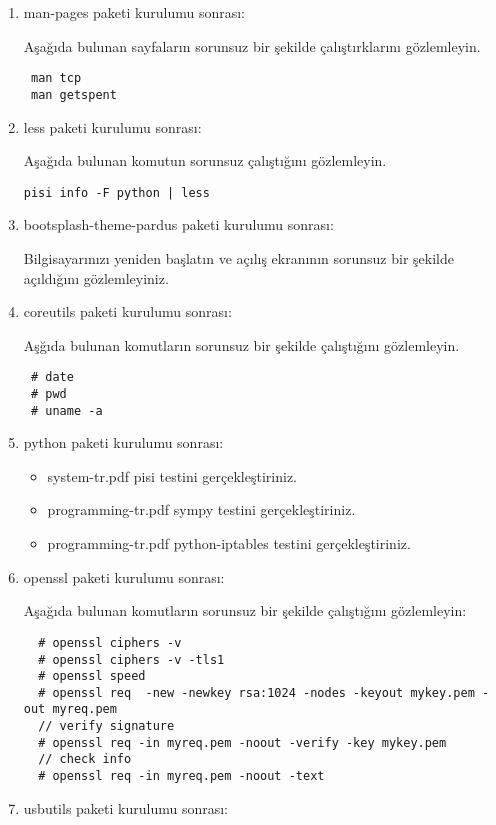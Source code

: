 \documentclass[a4paper,10pt]{article}
\begin{document}
\begin{enumerate}
\item man-pages paketi kurulumu sonrası:

Aşağıda bulunan sayfaların sorunsuz bir şekilde çalıştırklarını gözlemleyin.
\begin{verbatim}
 man tcp
 man getspent
\end{verbatim}


\item less paketi kurulumu sonrası:

Aşağıda bulunan komutun sorunsuz çalıştığını gözlemleyin.
\begin{verbatim}
pisi info -F python | less 
\end{verbatim}


\item bootsplash-theme-pardus paketi kurulumu sonrası:

Bilgisayarınızı yeniden başlatın ve açılış ekranının sorunsuz bir şekilde açıldığını gözlemleyiniz.

\item coreutils paketi kurulumu sonrası:

Aşğıda bulunan komutların sorunsuz bir şekilde çalıştığını gözlemleyin.
\begin{verbatim}
 # date
 # pwd
 # uname -a
\end{verbatim}


\item python paketi kurulumu sonrası:
\begin{itemize}
 \item system-tr.pdf pisi testini gerçekleştiriniz.
 \item programming-tr.pdf sympy testini gerçekleştiriniz.
 \item programming-tr.pdf python-iptables testini gerçekleştiriniz.
\end{itemize}


\item openssl paketi kurulumu sonrası:

Aşağıda bulunan komutların sorunsuz bir şekilde çalıştığını gözlemleyin:
\begin{verbatim}
  # openssl ciphers -v 
  # openssl ciphers -v -tls1
  # openssl speed
  # openssl req  -new -newkey rsa:1024 -nodes -keyout mykey.pem -out myreq.pem
  // verify signature
  # openssl req -in myreq.pem -noout -verify -key mykey.pem
  // check info
  # openssl req -in myreq.pem -noout -text

\end{verbatim}


\item usbutils paketi kurulumu sonrası:


\end{enumerate}
\end{document}
